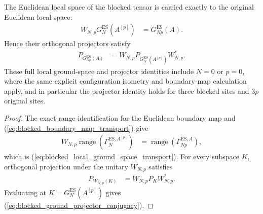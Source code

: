\begin{lemma}
    \label{thm:blocked_local_ground_space_transport}
    \leanok
    The Euclidean local space of the blocked tensor is carried exactly to the
    original Euclidean local space:
    \begin{align}
        W_{N,p}G_N^{\mathrm{ES}}(A^{[p]})
         & =G_{Np}^{\mathrm{ES}}(A).
        \label{eq:blocked_local_ground_space_transport}
    \end{align}
    Hence their orthogonal projectors satisfy
    \begin{align}
        P_{G_{Np}^{\mathrm{ES}}(A)}
         & =W_{N,p}P_{G_N^{\mathrm{ES}}(A^{[p]})}W_{N,p}^{*}.
        \label{eq:blocked_ground_projector_conjugacy}
    \end{align}
    These full local ground-space and projector identities include $N=0$ or
    $p=0$, where the same explicit configuration isometry and boundary-map
    calculation apply, and in particular the projector identity holds for three
    blocked sites and $3p$ original sites.
\end{lemma}

\begin{proof}
    \leanok
    The exact range identification for the Euclidean boundary map and
    (\ref{eq:blocked_boundary_map_transport}) give
    \begin{align}
        W_{N,p}\operatorname{range}\!\left(\Gamma_N^{\mathrm{ES},A^{[p]}}\right)
         & =\operatorname{range}\!\left(\Gamma_{Np}^{\mathrm{ES},A}\right),
        \label{eq:blocked_boundary_map_range_transport}
    \end{align}
    which is (\ref{eq:blocked_local_ground_space_transport}). For every
    subspace $K$, orthogonal projection under the unitary $W_{N,p}$ satisfies
    \begin{align}
        P_{W_{N,p}(K)} & =W_{N,p}P_KW_{N,p}^{*}.
        \label{eq:projection_under_blocked_isometry}
    \end{align}
    Evaluating at $K=G_N^{\mathrm{ES}}(A^{[p]})$ gives
    (\ref{eq:blocked_ground_projector_conjugacy}).
\end{proof}
